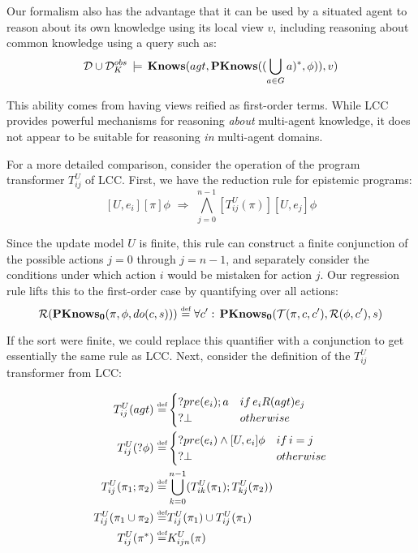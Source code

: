 Our formalism also has the advantage that it can be used by a situated
agent to reason about its own knowledge using its local view $v$,
including reasoning about common knowledge using a query such as:\[
\mathcal{D}\cup\mathcal{D}_{K}^{obs}\,\models\,\mathbf{Knows}(agt,\mathbf{PKnows}((\bigcup_{a\in G}a)^{*},\phi)),v)\]


This ability comes from having views reified as first-order terms.
While LCC provides powerful mechanisms for reasoning \emph{about}
multi-agent knowledge, it does not appear to be suitable for reasoning
\emph{in} multi-agent domains.

For a more detailed comparison, consider the operation of the program
transformer $T_{ij}^{U}$ of LCC. First, we have the reduction rule
for epistemic programs:\[
[U,e_{i}][\pi]\phi\,\,\Rightarrow\,\,\bigwedge_{j=0}^{n-1}[T_{ij}^{U}(\pi)][U,e_{j}]\phi\]


Since the update model $U$ is finite, this rule can construct a finite
conjunction of the possible actions $j=0$ through $j=n-1$, and separately
consider the conditions under which action $i$ would be mistaken
for action $j$. Our regression rule lifts this to the first-order
case by quantifying over all actions:\[
\mathcal{R}(\mathbf{PKnows_{0}}(\pi,\phi,do(c,s)))\stackrel{\mbox{\tiny def}}{=}\forall c':\,\mathbf{PKnows_{0}}(\mathcal{T}(\pi,c,c'),\mathcal{R}(\phi,c'),s)\]


If the sort were finite, we could replace this quantifier
with a conjunction to get essentially the same rule as LCC. Next,
consider the definition of the $T_{ij}^{U}$ transformer from LCC:

\begin{align*}
T_{ij}^{U}(agt)\stackrel{\mbox{\tiny def}}{=} & \begin{cases}
?pre(e_{i});a & if\, e_{i}R(agt)e_{j}\\
?\bot & otherwise\end{cases}\\
T_{ij}^{U}(?\phi)\stackrel{\mbox{\tiny def}}{=} & \begin{cases}
?pre(e_{i})\wedge[U,e_{i}]\phi & if\, i=j\\
?\bot & otherwise\end{cases}\\
T_{ij}^{U}(\pi_{1};\pi_{2})\stackrel{\mbox{\tiny def}}{=} & \bigcup_{k=0}^{n-1}(T_{ik}^{U}(\pi_{1});T_{kj}^{U}(\pi_{2}))\\
T_{ij}^{U}(\pi_{1}\cup\pi_{2})\stackrel{\mbox{\tiny def}}{=} & T_{ij}^{U}(\pi_{1})\cup T_{ij}^{U}(\pi_{1})\\
T_{ij}^{U}(\pi^{*})\stackrel{\mbox{\tiny def}}{=} & K_{ijn}^{U}(\pi)\end{align*}


